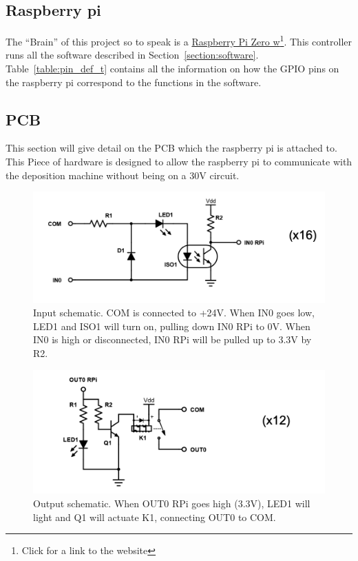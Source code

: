 \documentclass[titlepage]{article}
\begin{document}
\subsection{Raspberry pi}
\label{section:raspi}
The ``Brain'' of this project so to speak is a \href{https://www.raspberrypi.org/products/raspberry-pi-zero-w/}{ Raspberry Pi Zero w}\footnote{Click for a link to the website}. This controller runs all the software described in Section~\ref{section:software}. Table~\ref{table:pin_def_t} contains all the information on how the GPIO pins on the raspberry pi correspond to the functions in the software.

\subsection{PCB}
This section will give detail on the PCB which the raspberry pi is attached to. This Piece of hardware is designed to allow the raspberry pi to communicate with the deposition machine without being on a 30V circuit.
\begin{center}
    \begin{figure}[h!]
      \includegraphics[scale=.8]{inputschem.png}
      \caption{Input schematic. COM is connected to +24V. When IN0 goes low, LED1 and ISO1 will turn on, pulling down IN0 RPi to 0V. When IN0 is high or disconnected, IN0 RPi will be pulled up to 3.3V by R2.}
      \label{fig:input_schem}
    \end{figure}
\end{center}



\begin{center}
    \begin{figure}[h!]
      \includegraphics[scale=.9]{outputschem.png}
      \caption{Output schematic. When OUT0 RPi goes high (3.3V), LED1 will light and Q1 will actuate K1, connecting OUT0 to COM.}
      \label{fig:output_schem}
    \end{figure}
\end{center}
\end{document}
